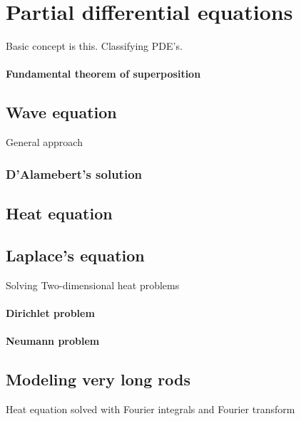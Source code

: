 \section{Partial differential equations}
Basic concept is this.
Classifying PDE's.
\paragraph{Fundamental theorem of superposition}


\subsection{Wave equation}
General approach

\subsubsection{D'Alamebert's solution}

\subsection{Heat equation}

\subsection{Laplace's equation}
Solving Two-dimensional heat problems

\paragraph{Dirichlet problem}
\paragraph{Neumann problem}

\subsection{Modeling very long rods}
Heat equation solved with Fourier integrals and Fourier transform
